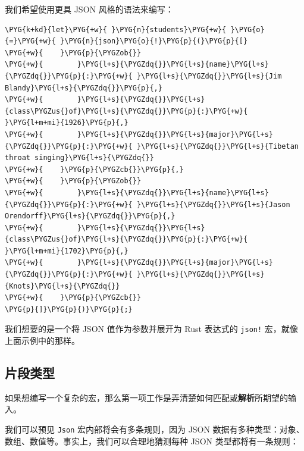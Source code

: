 我们希望使用更具 JSON 风格的语法来编写：

\begin{Verbatim}[commandchars=\\\{\},breaklines=true,breakanywhere=true,fontsize=\codefont,xleftmargin=17bp]
\PYG{k+kd}{let}\PYG{+w}{ }\PYG{n}{students}\PYG{+w}{ }\PYG{o}{=}\PYG{+w}{ }\PYG{n}{json}\PYG{o}{!}\PYG{p}{(}\PYG{p}{[}
\PYG{+w}{    }\PYG{p}{\PYGZob{}}
\PYG{+w}{        }\PYG{l+s}{\PYGZdq{}}\PYG{l+s}{name}\PYG{l+s}{\PYGZdq{}}\PYG{p}{:}\PYG{+w}{ }\PYG{l+s}{\PYGZdq{}}\PYG{l+s}{Jim Blandy}\PYG{l+s}{\PYGZdq{}}\PYG{p}{,}
\PYG{+w}{        }\PYG{l+s}{\PYGZdq{}}\PYG{l+s}{class\PYGZus{}of}\PYG{l+s}{\PYGZdq{}}\PYG{p}{:}\PYG{+w}{ }\PYG{l+m+mi}{1926}\PYG{p}{,}
\PYG{+w}{        }\PYG{l+s}{\PYGZdq{}}\PYG{l+s}{major}\PYG{l+s}{\PYGZdq{}}\PYG{p}{:}\PYG{+w}{ }\PYG{l+s}{\PYGZdq{}}\PYG{l+s}{Tibetan throat singing}\PYG{l+s}{\PYGZdq{}}
\PYG{+w}{    }\PYG{p}{\PYGZcb{}}\PYG{p}{,}
\PYG{+w}{    }\PYG{p}{\PYGZob{}}
\PYG{+w}{        }\PYG{l+s}{\PYGZdq{}}\PYG{l+s}{name}\PYG{l+s}{\PYGZdq{}}\PYG{p}{:}\PYG{+w}{ }\PYG{l+s}{\PYGZdq{}}\PYG{l+s}{Jason Orendorff}\PYG{l+s}{\PYGZdq{}}\PYG{p}{,}
\PYG{+w}{        }\PYG{l+s}{\PYGZdq{}}\PYG{l+s}{class\PYGZus{}of}\PYG{l+s}{\PYGZdq{}}\PYG{p}{:}\PYG{+w}{ }\PYG{l+m+mi}{1702}\PYG{p}{,}
\PYG{+w}{        }\PYG{l+s}{\PYGZdq{}}\PYG{l+s}{major}\PYG{l+s}{\PYGZdq{}}\PYG{p}{:}\PYG{+w}{ }\PYG{l+s}{\PYGZdq{}}\PYG{l+s}{Knots}\PYG{l+s}{\PYGZdq{}}
\PYG{+w}{    }\PYG{p}{\PYGZcb{}}
\PYG{p}{]}\PYG{p}{)}\PYG{p}{;}
\end{Verbatim}

我们想要的是一个将 JSON 值作为参数并展开为 Rust 表达式的 \texttt{json!} 宏，就像上面示例中的那样。

\subsection{片段类型}

如果想编写一个复杂的宏，那么第一项工作是弄清楚如何匹配或\textbf{解析}所期望的输入。

我们可以预见 \texttt{Json} 宏内部将会有多条规则，因为 JSON 数据有多种类型：对象、数组、数值等。事实上，我们可以合理地猜测每种 JSON 类型都将有一条规则：

